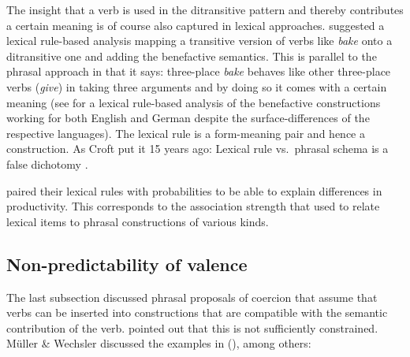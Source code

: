 \documentclass[output=paper]{langsci/langscibook}
\begin{document}
The insight that a verb is used in the ditransitive pattern and thereby contributes a certain
meaning is of course also captured in lexical approaches. \citet{BC99a} suggested a lexical
rule-based analysis mapping a transitive version of verbs like \emph{bake} onto a ditransitive one
and adding the benefactive semantics. This is parallel to the phrasal approach in that it says:
three-place \emph{bake} behaves like other three-place verbs (\eg \emph{give}) in taking three
arguments and by doing so it comes with a certain meaning (see \citealt{MuellerLFGphrasal} for a
lexical rule-based analysis of the benefactive constructions working for both English and German
despite the surface-differences of the respective languages). The lexical rule is a form-meaning pair
and hence a construction. As Croft put it 15 years ago: Lexical rule vs.\ phrasal schema is a false
dichotomy \citep{Croft2003a}.

\citet{BC99a} paired their lexical rules with probabilities to be able to explain differences in
productivity. This corresponds to the association strength that \citet[]{vanTrijp2011a} used to relate
lexical items to phrasal constructions of various kinds.

\subsection{Non-predictability of valence}

The last subsection discussed phrasal proposals of coercion that assume that verbs can be inserted
into constructions that are compatible with the semantic contribution of the verb. \citet[Section~7.4]{MWArgSt}
pointed out that this is not sufficiently constrained. Müller \& Wechsler discussed the examples in
(), among others:
\end{document}
